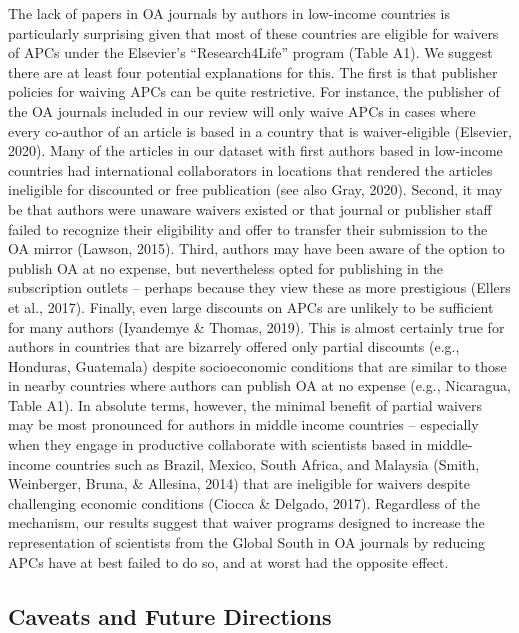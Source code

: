 \documentclass[english,man]{apa6}
\begin{document}
The lack of papers in OA journals by authors in low-income countries is particularly surprising given that most of these countries are eligible for waivers of APCs under the Elsevier's \enquote{Research4Life} program (Table A1). We suggest there are at least four potential explanations for this. The first is that publisher policies for waiving APCs can be quite restrictive. For instance, the publisher of the OA journals included in our review will only waive APCs in cases where every co-author of an article is based in a country that is waiver-eligible (Elsevier, 2020). Many of the articles in our dataset with first authors based in low-income countries had international collaborators in locations that rendered the articles ineligible for discounted or free publication (see also Gray, 2020). Second, it may be that authors were unaware waivers existed or that journal or publisher staff failed to recognize their eligibility and offer to transfer their submission to the OA mirror (Lawson, 2015). Third, authors may have been aware of the option to publish OA at no expense, but nevertheless opted for publishing in the subscription outlets -- perhaps because they view these as more prestigious (Ellers et al., 2017). Finally, even large discounts on APCs are unlikely to be sufficient for many authors (Iyandemye \& Thomas, 2019). This is almost certainly true for authors in countries that are bizarrely offered only partial discounts (e.g., Honduras, Guatemala) despite socioeconomic conditions that are similar to those in nearby countries where authors can publish OA at no expense (e.g., Nicaragua, Table A1). In absolute terms, however, the minimal benefit of partial waivers may be most pronounced for authors in middle income countries -- especially when they engage in productive collaborate with scientists based in middle-income countries such as Brazil, Mexico, South Africa, and Malaysia (Smith, Weinberger, Bruna, \& Allesina, 2014) that are ineligible for waivers despite challenging economic conditions (Ciocca \& Delgado, 2017). Regardless of the mechanism, our results suggest that waiver programs designed to increase the representation of scientists from the Global South in OA journals by reducing APCs have at best failed to do so, and at worst had the opposite effect.

\hypertarget{caveats-and-future-directions}{%
\subsection{Caveats and Future Directions}\label{caveats-and-future-directions}}
\end{document}

